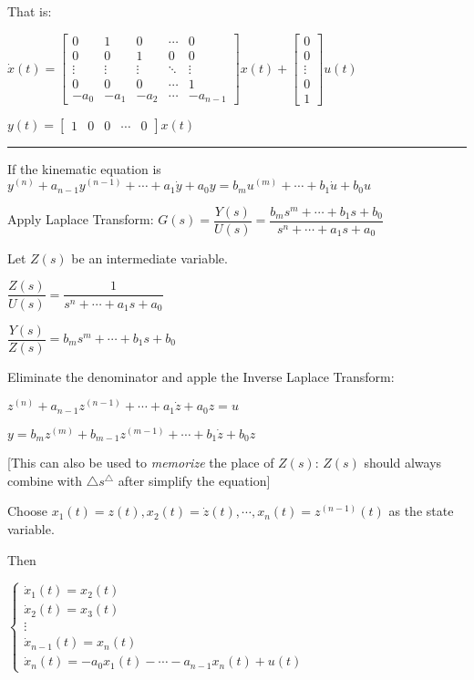 \documentclass{article}
\newcommand{\sectionline}{\color{black}\rule[2pt]{0.45\textwidth}{0.05em}\color{black}}
\begin{document}
\begin{spacing}{1.2}
That is:

$
\dot{x}(t)=\left[ \begin{array}{ccccc}{0} & {1} & {0} & {\cdots} & {0} \\ {0} & {0} & {1} & {0} & {0} \\ {\vdots} & {\vdots} & {\vdots} & {\ddots} & {\vdots} \\ {0} & {0} & {0} & {\cdots} & {1} \\ {-a_{0}} & {-a_{1}} & {-a_{2}} & {\cdots} & {-a_{n-1}}\end{array}\right] x(t)+\left[ \begin{array}{c}{0} \\ {0} \\ {\vdots} \\ {0} \\ {1}\end{array}\right] u(t)
$

$y(t)=\left[ \begin{array}{lllll}{1} & {0} & {0} & {\cdots} & {0}\end{array}\right] x(t)$

\sectionline

If the kinematic equation is $y^{(n)}+a_{n-1} y^{(n-1)}+\cdots+a_{1} \dot{y}+a_{0} y=b_{m} u^{(m)}+\cdots+b_{1} \dot{u}+b_{0} u$

Apply Laplace Transform: 
$G(s)=\dfrac{Y(s)}{U(s)}=\dfrac{b_{m} s^{m}+\cdots+b_{1} s+b_{0}}{s^{n}+\cdots+a_{1} s+a_{0}}$

Let $Z(s)$ be an intermediate variable.

$\dfrac{Z(s)}{U(s)}=\dfrac{1}{s^{n}+\cdots+a_{1} s+a_{0}}$

$\dfrac{Y(s)}{Z(s)}=b_{m} s^{m}+\cdots+b_{1} s+b_{0}$

Eliminate the denominator and apple the Inverse Laplace Transform:

$z^{(n)}+a_{n-1} z^{(n-1)}+\cdots+a_{1} \dot{z}+a_{0} z=u$

$y=b_{m} z^{(m)}+b_{m-1} z^{(m-1)}+\cdots+b_{1} \dot{z}+b_{0} z$

[This can also be used to \textit{memorize} the place of $Z(s)$: $Z(s)$ should always combine with $\triangle s^{\triangle}$ after simplify the equation]

Choose $x_{1}(t)=z(t), x_{2}(t)=\dot{z}(t), \cdots, x_{n}(t)=z^{(n-1)}(t)$ as the state variable.

Then 

$
\left\{\begin{array}{l}{\dot{x}_{1}(t)=x_{2}(t)} \\ {\dot{x}_{2}(t)=x_{3}(t)} \\ {\vdots} \\ {\dot{x}_{n-1}(t)=x_{n}(t)} \\ {\dot{x}_{n}(t)=-a_{0} x_{1}(t)-\cdots-a_{n-1} x_{n}(t)+u(t)}\end{array}\right.
$


\end{spacing}
\end{document}
